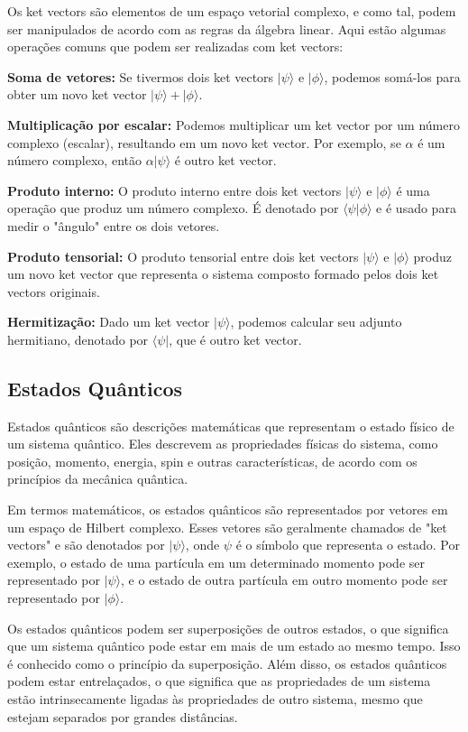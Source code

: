 \documentclass[12pt]{article}
\begin{document}
Os ket vectors são elementos de um espaço vetorial complexo, e como tal, podem ser manipulados de acordo com as regras da álgebra linear. Aqui estão algumas operações comuns que podem ser realizadas com ket vectors:

\textbf{Soma de vetores:} Se tivermos dois ket vectors $|\psi\rangle$ e $|\phi\rangle$, podemos somá-los para obter um novo ket vector $|\psi\rangle + |\phi\rangle$.

\textbf{Multiplicação por escalar:} Podemos multiplicar um ket vector por um número complexo (escalar), resultando em um novo ket vector. Por exemplo, se $\alpha$ é um número complexo, então $\alpha|\psi\rangle$ é outro ket vector.

\textbf{Produto interno:} O produto interno entre dois ket vectors $|\psi\rangle$ e $|\phi\rangle$ é uma operação que produz um número complexo. É denotado por $\langle\psi|\phi\rangle$ e é usado para medir o "ângulo" entre os dois vetores.

\textbf{Produto tensorial:} O produto tensorial entre dois ket vectors $|\psi\rangle$ e $|\phi\rangle$ produz um novo ket vector que representa o sistema composto formado pelos dois ket vectors originais.

\textbf{Hermitização:} Dado um ket vector $|\psi\rangle$, podemos calcular seu adjunto hermitiano, denotado por $\langle\psi|$, que é outro ket vector.

\subsection{Estados Quânticos}

Estados quânticos são descrições matemáticas que representam o estado físico de um sistema quântico. Eles descrevem as propriedades físicas do sistema, como posição, momento, energia, spin e outras características, de acordo com os princípios da mecânica quântica.

Em termos matemáticos, os estados quânticos são representados por vetores em um espaço de Hilbert complexo. Esses vetores são geralmente chamados de "ket vectors" e são denotados por $|\psi\rangle$, onde $\psi$ é o símbolo que representa o estado. Por exemplo, o estado de uma partícula em um determinado momento pode ser representado por $|\psi\rangle$, e o estado de outra partícula em outro momento pode ser representado por $|\phi\rangle$.

Os estados quânticos podem ser superposições de outros estados, o que significa que um sistema quântico pode estar em mais de um estado ao mesmo tempo. Isso é conhecido como o princípio da superposição. Além disso, os estados quânticos podem estar entrelaçados, o que significa que as propriedades de um sistema estão intrinsecamente ligadas às propriedades de outro sistema, mesmo que estejam separados por grandes distâncias.
\end{document}

